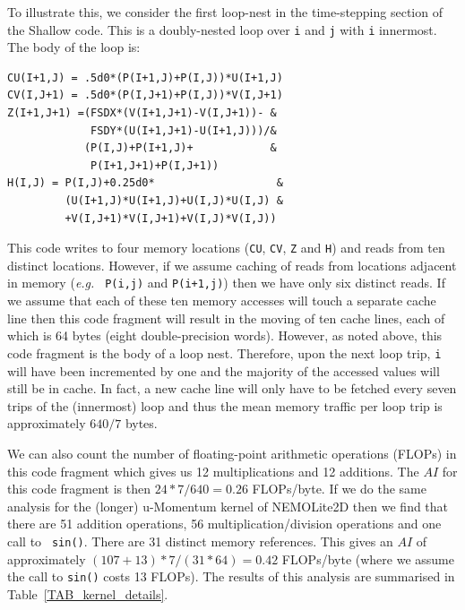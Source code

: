\documentclass[12pt]{article}
\begin{document}
To illustrate this, we consider the first loop-nest in the
time-stepping section of the Shallow code. This is a doubly-nested
loop over {\tt i} and {\tt j} with {\tt i} innermost. The body of the
loop is:
\begin{verbatim}
CU(I+1,J) = .5d0*(P(I+1,J)+P(I,J))*U(I+1,J)
CV(I,J+1) = .5d0*(P(I,J+1)+P(I,J))*V(I,J+1)
Z(I+1,J+1) =(FSDX*(V(I+1,J+1)-V(I,J+1))- &
             FSDY*(U(I+1,J+1)-U(I+1,J)))/&
            (P(I,J)+P(I+1,J)+            &
             P(I+1,J+1)+P(I,J+1))
H(I,J) = P(I,J)+0.25d0*                   &
         (U(I+1,J)*U(I+1,J)+U(I,J)*U(I,J) & 
         +V(I,J+1)*V(I,J+1)+V(I,J)*V(I,J))
\end{verbatim}
This code writes to four memory locations ({\tt CU}, {\tt CV}, {\tt Z}
and {\tt H}) and reads from ten distinct locations.  However, if we
assume caching of reads from locations adjacent in memory ({\it e.g.} {\tt
  P(i,j)} and {\tt P(i+1,j)}) then we have only six distinct reads.
If we assume that each of these ten memory accesses will touch a
separate cache line then this code fragment will result in the moving
of ten cache lines, each of which is 64 bytes (eight double-precision
words). However, as noted above, this code fragment is the body of a
loop nest. Therefore, upon the next loop trip, {\tt i} will have been
incremented by one and the majority of the accessed values will still
be in cache. In fact, a new cache line will only have to be fetched
every seven trips of the (innermost) loop and thus the mean memory
traffic per loop trip is approximately $640/7$ bytes.

We can also count the number of floating-point arithmetic operations
(FLOPs) in this code fragment which gives us 12 multiplications and 12
additions. The $AI$ for this code fragment is then $24*7/640 = 0.26$
FLOPs/byte.  If we do the same analysis for the (longer) u-Momentum
kernel of NEMOLite2D then we find that there are 51 addition
operations, 56 multiplication/division operations and one call to {\tt
  sin()}. There are 31 distinct memory references. This gives an $AI$
of approximately $(107+13)*7/(31*64) = 0.42$ FLOPs/byte (where we
assume the call to {\tt sin()} costs 13 FLOPs). The results of this
analysis are summarised in Table~\ref{TAB_kernel_details}.
\end{document}
